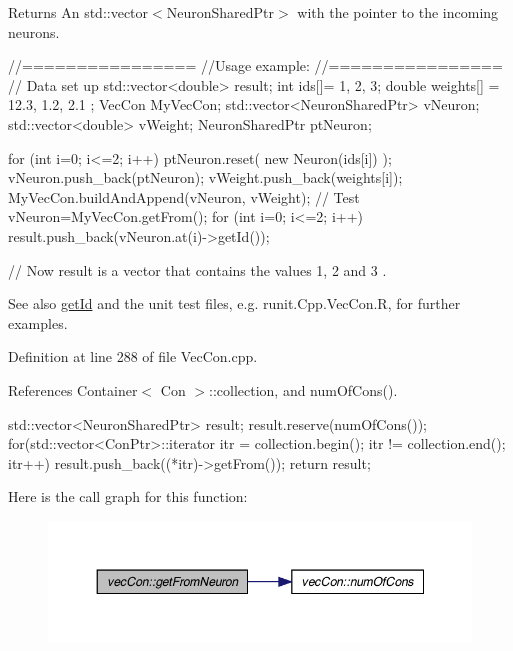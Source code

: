 \begin{DoxyReturn}{Returns}
An std::vector$<$NeuronSharedPtr$>$ with the pointer to the incoming neurons.
\end{DoxyReturn}

\begin{DoxyCode}
        //================
        //Usage example:
        //================
        // Data set up
                std::vector<double> result;
                int ids[]= {1, 2, 3};
                double weights[] = {12.3, 1.2, 2.1 };
                VecCon MyVecCon;
                std::vector<NeuronSharedPtr> vNeuron;
                std::vector<double> vWeight;
                NeuronSharedPtr ptNeuron;

                        for (int i=0; i<=2; i++) {
                                ptNeuron.reset( new Neuron(ids[i]) );
                                vNeuron.push_back(ptNeuron);
                                vWeight.push_back(weights[i]);
                        }
                        MyVecCon.buildAndAppend(vNeuron, vWeight);
                // Test
                        vNeuron=MyVecCon.getFrom();
                        for (int i=0; i<=2; i++) {
                                result.push_back(vNeuron.at(i)->getId());
                        }

        // Now result is a vector that contains the values 1, 2 and 3 .
\end{DoxyCode}


\begin{DoxySeeAlso}{See also}
\hyperlink{classvec_con_aa9f3f5df4c4060951c975c4c829b8471}{getId} and the unit test files, e.g. runit.Cpp.VecCon.R, for further examples. 
\end{DoxySeeAlso}


Definition at line 288 of file VecCon.cpp.



References Container$<$ Con $>$::collection, and numOfCons().


\begin{DoxyCode}
                                                    {
        std::vector<NeuronSharedPtr> result;
        result.reserve(numOfCons());
        for(std::vector<ConPtr>::iterator itr = collection.begin();   itr != 
      collection.end();   itr++)   {
                result.push_back((*itr)->getFrom());
        }
        return result;
}
\end{DoxyCode}


Here is the call graph for this function:\nopagebreak
\begin{figure}[H]
\begin{center}
\leavevmode
\includegraphics[width=348pt]{classvec_con_ae72d00aedcd054e690f1dcf2ca5ac2c2_cgraph}
\end{center}
\end{figure}


